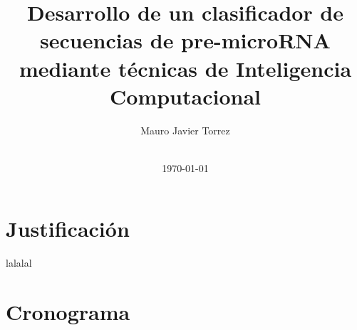 \documentclass[bibliography=openstyle]{scrartcl}
\begin{document}
\begin{titlepage}
\titlehead{\center Universidad Nacional del Litoral\\
Facultad de Ingeniería y Ciencias Hídricas}
\subject{Ingeniería en Informática\\Propuesta de Proyecto Final de Carrera}
\title{Desarrollo de un clasificador de secuencias de pre-microRNA mediante
  técnicas de Inteligencia Computacional}
\author{Mauro Javier Torrez}
\publishers{\-\\[4em]{Director\\Dr. Diego H. Milone}\\[2em]
  {Asesora temática\\Dra. Georgina S. Stegmayer}}
\date{\-\\[2em]\today}
\maketitle
\end{titlepage}
%

\section{Justificación}
lalalal
%
\section{Cronograma}
\end{document}
